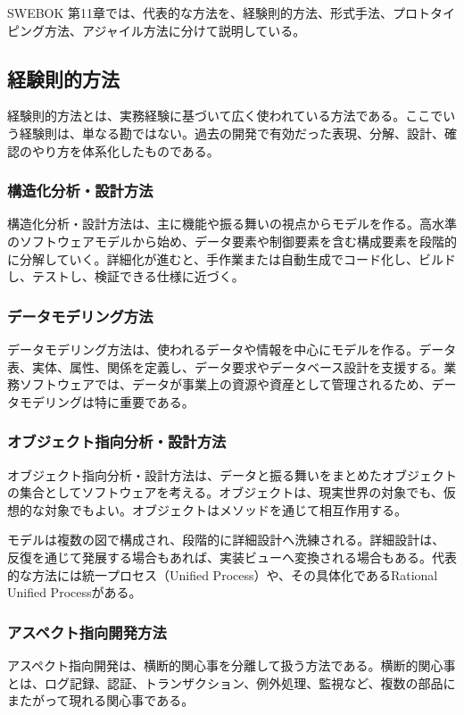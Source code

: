 \documentclass[a4paper,11pt]{ltjsarticle}
\begin{document}
SWEBOK 第11章では、代表的な方法を、経験則的方法、形式手法、プロトタイピング方法、アジャイル方法に分けて説明している。

\subsection{経験則的方法}
経験則的方法とは、実務経験に基づいて広く使われている方法である。ここでいう経験則は、単なる勘ではない。過去の開発で有効だった表現、分解、設計、確認のやり方を体系化したものである。

\subsubsection{構造化分析・設計方法}
構造化分析・設計方法は、主に機能や振る舞いの視点からモデルを作る。高水準のソフトウェアモデルから始め、データ要素や制御要素を含む構成要素を段階的に分解していく。詳細化が進むと、手作業または自動生成でコード化し、ビルドし、テストし、検証できる仕様に近づく。

\subsubsection{データモデリング方法}
データモデリング方法は、使われるデータや情報を中心にモデルを作る。データ表、実体、属性、関係を定義し、データ要求やデータベース設計を支援する。業務ソフトウェアでは、データが事業上の資源や資産として管理されるため、データモデリングは特に重要である。

\subsubsection{オブジェクト指向分析・設計方法}
オブジェクト指向分析・設計方法は、データと振る舞いをまとめたオブジェクトの集合としてソフトウェアを考える。オブジェクトは、現実世界の対象でも、仮想的な対象でもよい。オブジェクトはメソッドを通じて相互作用する。

モデルは複数の図で構成され、段階的に詳細設計へ洗練される。詳細設計は、反復を通じて発展する場合もあれば、実装ビューへ変換される場合もある。代表的な方法には統一プロセス（Unified Process）や、その具体化であるRational Unified Processがある。

\subsubsection{アスペクト指向開発方法}
アスペクト指向開発は、横断的関心事を分離して扱う方法である。横断的関心事とは、ログ記録、認証、トランザクション、例外処理、監視など、複数の部品にまたがって現れる関心事である。
\end{document}
